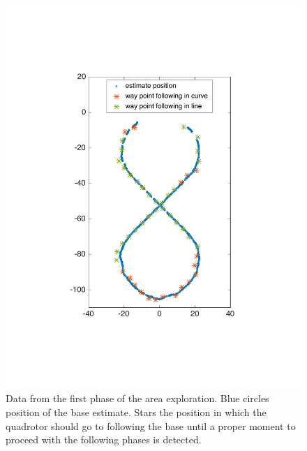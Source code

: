 \begin{figure}[!htbp]
    \centering
    \includegraphics[width=1.0\textwidth]{img/following_platform_long_map_waypoints.pdf}
    \caption{Data from the first phase of the area exploration. Blue circles position of the base estimate. Stars the position in which the quadrotor should go to following the base until a proper moment to proceed with the following phases is detected. }
    \label{fig:map_waypoints}
\end{figure}

